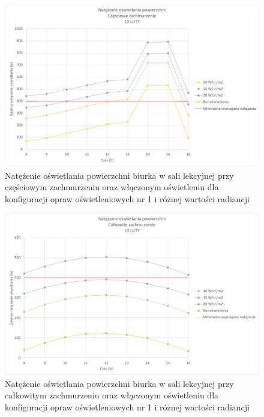 \documentclass[a4paper,12pt]{article}
\begin{document}
	\begin{figure}[!ht]
		\centering
		\includegraphics[width=\linewidth]{Wykresy/oswietlenie_1_czesciowe_zachmurzenie.pdf}
		\caption{Natężenie oświetlania powierzchni biurka w sali lekcyjnej przy częściowym zachmurzeniu  oraz włączonym oświetleniu dla konfiguracji opraw oświetleniowych nr 1 i różnej wartości radiancji}
		\label{oswietlenie_1_czesciowe_zachmurzenie}
	\end{figure}

	\begin{figure}[h!]
		\centering
		\includegraphics[width=\linewidth]{Wykresy/oswietlenie_1_calkowite_zachmurzenie.pdf}
		\caption{Natężenie oświetlania powierzchni biurka w sali lekcyjnej przy całkowitym zachmurzeniu  oraz włączonym oświetleniu dla konfiguracji opraw oświetleniowych nr 1 i różnej wartości radiancji}
		\label{oswietlenie_1_calkowite_zachmurzenie}
	\end{figure}
\end{document}
